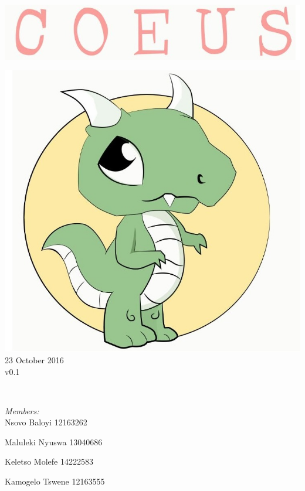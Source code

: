 \documentclass[a4paper,12pt]{article}
\begin{document}
\begin{titlepage}
	\includegraphics[width=\textwidth]{name} \\[1cm]
	\begin{minipage}{0.4\textwidth}
	\begin{flushleft} \large
	\includegraphics[width=\textwidth]{logo} \\[0.5cm]
	{\large 23 October 2016}\\
	{\large v0.1}
	\end{flushleft}
	\end{minipage}
	~
	\begin{minipage}{0.5\textwidth}
	\begin{flushright} \large
	\emph{Members:}\\%
	Nsovo Baloyi 12163262

	Maluleki Nyuswa 13040686
	
	Keletso Molefe 14222583
	
	Kamogelo Tswene 12163555

	\end{flushright}
	\end{minipage}\\[4cm]
\end{titlepage}
\end{document}
